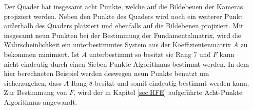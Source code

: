 Der Quader hat insgesamt acht Punkte, welche auf die Bildebenen der Kameras projiziert werden. Neben den Punkte des Quaders wird noch ein weiterer Punkt außerhalb des Quaders platziert und ebenfalls auf die Bildebenen projiziert. Mit insgesamt neun Punkten bei der Bestimmung der Fundamentalmatrix, wird die Wahrscheinlichkeit ein unterbestimmtes System aus der Koeffizientenmatrix $A$ zu bekommen minimiert. Ist $A$ unterbestimmt so besitzt sie Rang 7 und $F$ kann nicht eindeutig durch einen Sieben-Punkte-Algorithmus bestimmt werden\cite{HZ,LongQuan}. In dem hier berechneten Beispiel werden deswegen neun Punkte benutzt um sicherzugehen, dass $A$ Rang 8 besitzt und somit eindeutig bestimmt werden kann. Zur Bestimmung von $F$, wird der in Kapitel \ref{sec:HFE} aufgeführte Acht-Punkte Algorithmus angewandt.\\





